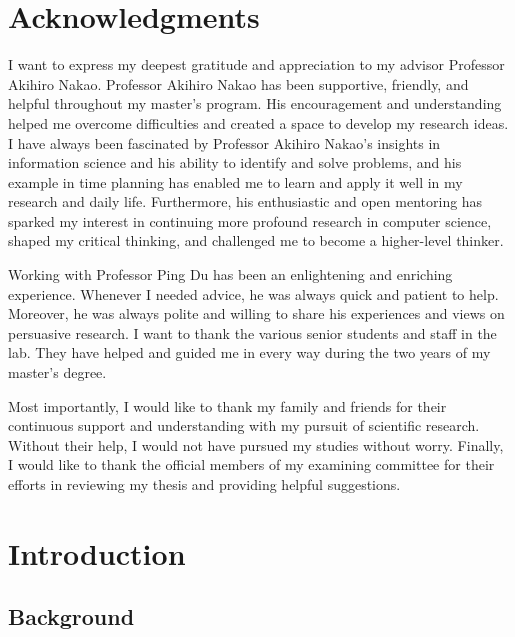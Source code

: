 \documentclass[a4paper,12pt]{report}
\begin{document}
\newpage

\chapter*{\centering Acknowledgments}

I want to express my deepest gratitude and appreciation to my advisor
Professor Akihiro Nakao. Professor Akihiro Nakao has been supportive,
friendly, and helpful throughout my master's program. His encouragement
and understanding helped me overcome difficulties and created a space to
develop my research ideas. I have always been fascinated by Professor
Akihiro Nakao's insights in information science and his ability to identify
and solve problems, and his example in time planning has enabled me to learn
and apply it well in my research and daily life. Furthermore, his enthusiastic
and open mentoring has sparked my interest in continuing more profound
research in computer science, shaped my critical thinking, and challenged
me to become a higher-level thinker.

Working with Professor Ping Du has been an enlightening and enriching
experience. Whenever I needed advice, he was always quick and patient to
help. Moreover, he was always polite and willing to share his experiences
and views on persuasive research.
I want to thank the various senior students and staff in the lab. They
have helped and guided me in every way during the two years of my master's
degree.

Most importantly, I would like to thank my family and friends for their
continuous support and understanding with my pursuit of scientific research.
Without their help, I would not have pursued my studies without worry.
Finally, I would like to thank the official members of my examining
committee for their efforts in reviewing my thesis and providing helpful
suggestions.

\tableofcontents
\listoffigures
\listoftables

\cleardoublepage

\chapter{Introduction}

\setcounter{page}{1}
\renewcommand{\thepage}{\arabic{page}}

\section{Background}
\end{document}
